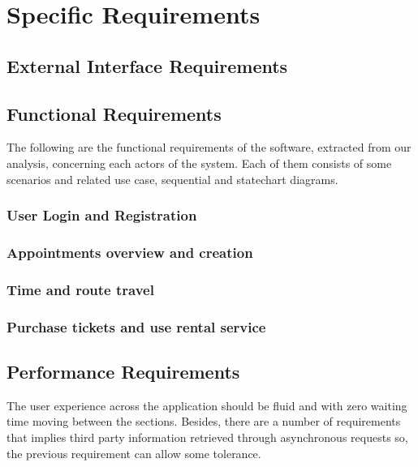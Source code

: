 \chapter{Specific Requirements}
\label{cha:requirements}

\section{External Interface Requirements}


\section{Functional Requirements}
\label{sec:func_req}
The following are the functional requirements of the software, extracted from our analysis, concerning each actors of the system. Each of them consists of some scenarios and related use case, sequential and statechart diagrams.

\subsection*{User Login and Registration}


\subsection*{Appointments overview and creation}


\subsection*{Time and route travel}


\subsection*{Purchase tickets and use rental service}


\section{Performance Requirements}
\label{sec:perf_req}
The user experience across the application should be fluid and with zero waiting time moving between the sections. Besides, there are a number of requirements that implies third party information retrieved through asynchronous requests so, the previous requirement can allow some tolerance.

